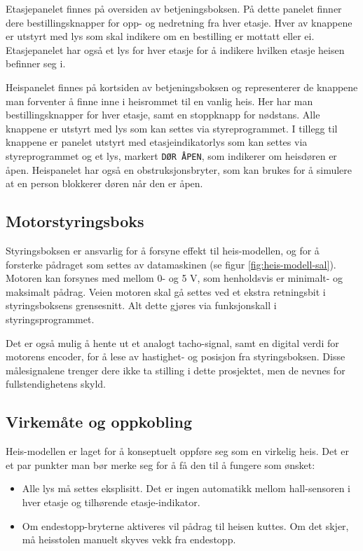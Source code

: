 \begin{alphasection}
Etasjepanelet finnes på oversiden av betjeningsboksen. På dette panelet finner dere bestillingsknapper for opp- og nedretning fra hver etasje. Hver av knappene er utstyrt med lys som skal indikere om en bestilling er mottatt eller ei. Etasjepanelet har også et lys for hver etasje for å indikere hvilken etasje heisen befinner seg i.

Heispanelet finnes på kortsiden av betjeningsboksen og representerer de knappene man forventer å finne inne i heisrommet til en vanlig heis. Her har man bestillingsknapper for hver etasje, samt en stoppknapp for nødstans. Alle knappene er utstyrt med lys som kan settes via styreprogrammet. I tillegg til knappene er panelet utstyrt med etasjeindikatorlys som kan settes via styreprogrammet og et lys, markert \verb|DØR ÅPEN|, som indikerer om heisdøren er åpen. Heispanelet har også en obstruksjonsbryter, som kan brukes for å simulere at en person blokkerer døren når den er åpen.

\subsection{Motorstyringsboks}

Styringsboksen er ansvarlig for å forsyne effekt til heis-modellen, og for å forsterke pådraget som settes av datamaskinen (se figur \ref{fig:heis-modell-sal}). Motoren kan forsynes med mellom 0- og 5 V, som henholdsvis er minimalt- og maksimalt pådrag. Veien motoren skal gå settes ved et ekstra retningsbit i styringsboksens grensesnitt. Alt dette gjøres via funksjonskall i styringsprogrammet. 

Det er også mulig å hente ut et analogt tacho-signal, samt en digital verdi for motorens encoder, for å lese av hastighet- og posisjon fra styringsboksen. Disse målesignalene trenger dere ikke ta stilling i dette prosjektet, men de nevnes for fullstendighetens skyld.

\subsection{Virkemåte og oppkobling}
Heis-modellen er laget for å konseptuelt oppføre seg som en virkelig heis. Det er et par punkter man bør merke seg for å få den til å fungere som ønsket:

\begin{itemize}
    \item Alle lys må settes eksplisitt. Det er ingen automatikk mellom hall-sensoren i hver etasje og tilhørende etasje-indikator.
    \item Om endestopp-bryterne aktiveres vil pådrag til heisen kuttes. Om det skjer, må heisstolen manuelt skyves vekk fra endestopp.
    

\end{itemize}
\end{alphasection}
